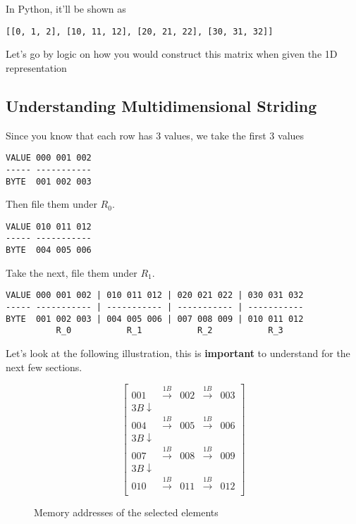\documentclass[oneside, 12pt]{report}
\begin{document}
In Python, it'll be shown as

\begin{verbatim}
[[0, 1, 2], [10, 11, 12], [20, 21, 22], [30, 31, 32]]
\end{verbatim}

Let's go by logic on how you would construct this matrix when given the 1D representation

\subsection{Understanding Multidimensional Striding}

Since you know that each row has 3 values, we take the first 3 values

\begin{verbatim}
VALUE 000 001 002
----- -----------
BYTE  001 002 003
\end{verbatim}

Then file them under $R_0$.

\begin{verbatim}
VALUE 010 011 012
----- -----------
BYTE  004 005 006
\end{verbatim}

Take the next, file them under $R_1$.

\begin{verbatim}
VALUE 000 001 002 | 010 011 012 | 020 021 022 | 030 031 032
----- ----------- | ----------- | ----------- | -----------
BYTE  001 002 003 | 004 005 006 | 007 008 009 | 010 011 012
          R_0           R_1           R_2           R_3
\end{verbatim}

Let's look at the following illustration, this is \textbf{important} to understand for the next few sections.

\begin{figure}[H]
\begin{equation*}
\begin{bmatrix}
001 & \xrightarrow{1B} & 002 &\xrightarrow{1B} & 003 \\
3B \downarrow \\
004 & \xrightarrow{1B} & 005 &\xrightarrow{1B} & 006 \\
3B \downarrow \\
007 & \xrightarrow{1B} & 008 &\xrightarrow{1B} & 009 \\
3B \downarrow \\
010 & \xrightarrow{1B} & 011 &\xrightarrow{1B} & 012 \\
\end{bmatrix}
\end{equation*}
\caption{Memory addresses of the selected elements}
\end{figure}
\end{document}
